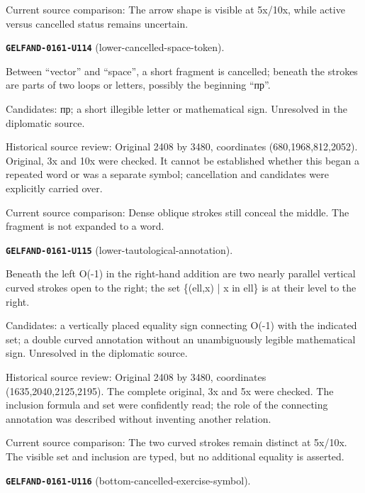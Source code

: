Current source comparison: The arrow shape is visible at 5x/10x, while active versus cancelled status remains uncertain.\par\medskip
\par\noindent\leavevmode{}\label{GELFAND-0161-U114}\label{GELFAND-P001488:lower-cancelled-space-token}\textbf{\texttt{GELFAND-0161-U114}} (lower-cancelled-space-token).\nopagebreak[4]\par
Between “vector” and “space”, a short fragment is cancelled; beneath the strokes are parts of two loops or letters, possibly the beginning “пр”.\par
Candidates: пр; a short illegible letter or mathematical sign. Unresolved in the diplomatic source.\par
Historical source review: Original 2408 by 3480, coordinates (680,1968,812,2052). Original, 3x and 10x were checked. It cannot be established whether this began a repeated word or was a separate symbol; cancellation and candidates were explicitly carried over.\par
Current source comparison: Dense oblique strokes still conceal the middle. The fragment is not expanded to a word.\par\medskip
\par\noindent\leavevmode{}\label{GELFAND-0161-U115}\label{GELFAND-P001488:lower-tautological-annotation}\textbf{\texttt{GELFAND-0161-U115}} (lower-tautological-annotation).\nopagebreak[4]\par
Beneath the left O(-1) in the right-hand addition are two nearly parallel vertical curved strokes open to the right; the set \{(ell,x) | x in ell\} is at their level to the right.\par
Candidates: a vertically placed equality sign connecting O(-1) with the indicated set; a double curved annotation without an unambiguously legible mathematical sign. Unresolved in the diplomatic source.\par
Historical source review: Original 2408 by 3480, coordinates (1635,2040,2125,2195). The complete original, 3x and 5x were checked. The inclusion formula and set were confidently read; the role of the connecting annotation was described without inventing another relation.\par
Current source comparison: The two curved strokes remain distinct at 5x/10x. The visible set and inclusion are typed, but no additional equality is asserted.\par\medskip
\par\noindent\leavevmode{}\label{GELFAND-0161-U116}\label{GELFAND-P001488:bottom-cancelled-exercise-symbol}\textbf{\texttt{GELFAND-0161-U116}} (bottom-cancelled-exercise-symbol).\nopagebreak[4]\par
